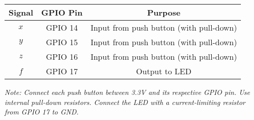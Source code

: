 \documentclass{article}
\begin{document}
\begin{center}
\begin{tabular}{|c|c|c|}
\hline
\textbf{Signal} & \textbf{GPIO Pin} & \textbf{Purpose} \\
\hline
\(x\) & GPIO 14 & Input from push button (with pull-down) \\
\(y\) & GPIO 15 & Input from push button (with pull-down) \\
\(z\) & GPIO 16 & Input from push button (with pull-down) \\
\(f\) & GPIO 17 & Output to LED \\
\hline
\end{tabular}
\end{center}

\bigskip

\textit{Note: Connect each push button between 3.3V and its respective GPIO pin. Use internal pull-down resistors. Connect the LED with a current-limiting resistor from GPIO 17 to GND.}
\end{document}

